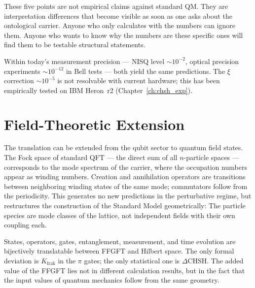 These five points are not empirical claims against standard
QM. They are interpretation differences that become visible
as soon as one asks about the ontological carrier. Anyone who only calculates with the numbers
can ignore them. Anyone who wants to know why the numbers are
these specific ones will find them to be testable structural statements.

Within today's measurement precision --- NISQ level $\sim10^{-2}$,
optical precision experiments $\sim10^{-12}$ in Bell tests --- both
yield the same predictions. The $\xi$ correction $\sim10^{-5}$ is
not resolvable with current hardware; this has been empirically tested
on IBM Heron~r2 (Chapter~\ref{ch:chsh_exp}).

\section{Field-Theoretic Extension}

The translation can be extended from the qubit sector to quantum field states.
The Fock space of standard QFT --- the direct sum of all
$n$-particle spaces --- corresponds to the mode spectrum of the carrier, where
the occupation numbers appear as winding numbers. Creation and
annihilation operators are transitions between neighboring
winding states of the same mode; commutators follow from the
periodicity. This generates no new predictions in the perturbative
regime, but restructures the construction of the Standard Model geometrically:
The particle species are mode classes of the lattice, not independent
fields with their own coupling each.

\begin{keypoint}
States, operators, gates, entanglement, measurement, and time evolution
are bijectively translatable between FFGFT and Hilbert space. The only
formal deviation is $K_{\mathrm{frak}}$ in the $\pi$ gates; the
only statistical one is $\Delta$CHSH. The added value of the FFGFT lies not
in different calculation results, but in the fact that the input values of
quantum mechanics follow from the same geometry.
\end{keypoint}

